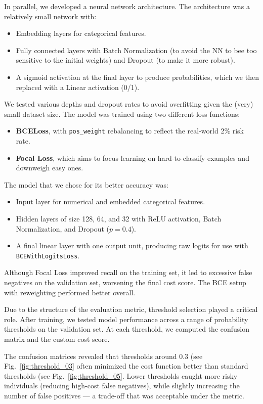 \documentclass[12pt]{report}
\begin{document}
In parallel, we developed a neural network architecture. The architecture was a relatively small network with:
\begin{itemize}
    \item Embedding layers for categorical features.
    \item Fully connected layers with Batch Normalization (to avoid the NN to bee too sensitive to the initial weights) and Dropout (to make it more robust).
    \item A sigmoid activation at the final layer to produce probabilities, which we then replaced with a Linear activation (0/1).
\end{itemize}

We tested various depths and dropout rates to avoid overfitting given the (very) small dataset size. The model was trained using two different loss functions:
\begin{itemize}
    \item \textbf{BCELoss}, with \texttt{pos\_weight} rebalancing to reflect the real-world 2\% risk rate.
    \item \textbf{Focal Loss}, which aims to focus learning on hard-to-classify examples and downweigh easy ones.
\end{itemize}

The model that we chose for its better accuracy was:

\begin{itemize}
    \item Input layer for numerical and embedded categorical features.
    \item Hidden layers of size 128, 64, and 32 with ReLU activation, Batch Normalization, and Dropout ($p = 0.4$).
    \item A final linear layer with one output unit, producing raw logits for use with \texttt{BCEWithLogitsLoss}.
\end{itemize}


Although Focal Loss improved recall on the training set, it led to excessive false negatives on the validation set, worsening the final cost score. The BCE setup with reweighting performed better overall.

Due to the structure of the evaluation metric, threshold selection played a critical role. After training, we tested model performance across a range of probability thresholds on the validation set. At each threshold, we computed the confusion matrix and the custom cost score.

The confusion matrices revealed that thresholds around 0.3 (see Fig.~\ref{fig:threshold_03} often minimized the cost function better than standard thresholds (see Fig.~\ref{fig:threshold_05}. Lower thresholds caught more risky individuals (reducing high-cost false negatives), while slightly increasing the number of false positives — a trade-off that was acceptable under the metric.
\end{document}
